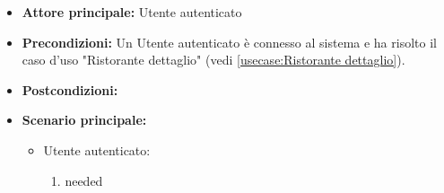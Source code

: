 \label{usecase:Condividi}
\begin{itemize}
\item \textbf{Attore principale:} Utente autenticato
\item \textbf{Precondizioni:}
Un Utente autenticato è connesso al sistema e ha risolto il caso d'uso "Ristorante dettaglio" (vedi \autoref{usecase:Ristorante dettaglio}).
\item \textbf{Postcondizioni:}
\item \textbf{Scenario principale:}
\begin{itemize}
\item Utente autenticato:
\begin{enumerate}
\item needed
\end{enumerate}
\end{itemize}

\end{itemize}